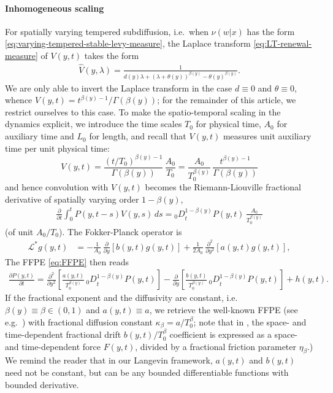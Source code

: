 \documentclass[a4paper,12pt]{elsarticle}
\numberwithin{equation}{section}
\theoremstyle{plain}
\theoremstyle{definition}
\theoremstyle{remark}
\numberwithin{equation}{section}
\newcommand{\1}{\mathbf 1}
\begin{document}
\paragraph{Inhomogeneous scaling}
For spatially varying tempered subdiffusion, i.e.\ when $\nu(w|x)$ has the form 
\eqref{eq:varying-tempered-stable-levy-measure}, 
the Laplace transform \eqref{eq:LT-renewal-measure} of $V(y,t)$ takes the form
\begin{align}
\hat V(y,\lambda) =
\frac{1}{d(y) \lambda + (\lambda + \theta(y))^{\beta(y)} - \theta(y)^{\beta(y)}}.
\end{align}
We are only able to invert the Laplace transform in the case $d \equiv 0$ and
$\theta \equiv 0$, whence $V(y,t) = t^{\beta(y)-1} / \Gamma(\beta(y))$; 
for the remainder of this article, we restrict ourselves to this case.
To make the spatio-temporal scaling in the dynamics explicit, we introduce the time scales
$T_0$ for physical time, $A_0$ for auxiliary time and $L_0$ for length, 
and recall that $V(y,t)$ measures unit auxiliary time per unit physical 
time:
$$V(y,t) = \frac{(t/T_0)^{\beta(y)-1}}{\Gamma(\beta(y))}\, \frac{A_0}{T_0}
= \frac{A_0}{T_0^{\beta(y)}} \, \frac{t^{\beta(y) - 1}}{\Gamma(\beta(y))}$$
and hence convolution with $V(y,t)$ becomes the Riemann-Liouville
fractional derivative of spatially varying order $1-\beta(y)$, 
\begin{align}
  \frac{\partial}{\partial t} \int_0^t P(y,t-s) V(y,s)\,ds
  = {_0D}_t^{1-\beta(y)} P(y,t) \, \frac{A_0}{T_0^{\beta(y)}}
\end{align}
(of unit $A_0 / T_0$).
The Fokker-Planck operator is
\begin{align}
\mathcal L^* g(y,t)
&= -\frac{1}{A_0}\,\frac{\partial }{\partial y}[b(y,t) g(y,t)]
+\frac{1}{2A_0}\,\frac{\partial^2 }{\partial y^2}[a(y,t) g(y,t)],
\end{align}
The FFPE \eqref{eq:FFPE} then reads
\begin{align} \label{eq:FFPE-with-scale}
\frac{\partial P(y,t)}{\partial t}
= \frac{\partial^2}{\partial y^2} \left[\frac{a(y,t)}{T_0^{\beta(y)}}
  \, {_0 D}_t^{1-\beta(y)} P(y,t)\right]
  - \frac{\partial}{\partial y} \left[\frac{b(y,t)}{T_0^{\beta(y)}}
  \, {_0 D}_t^{1-\beta(y)} P(y,t)\right]
  + h(y,t).
\end{align}
If the fractional exponent and the diffusivity are constant, i.e.\ 
$\beta(y) \equiv \beta \in (0,1)$ and $a(y,t) \equiv a$,
we retrieve the well-known FFPE (see e.g.\ \cite[Eq.(3)]{HLS10PRL})
with fractional diffusion constant $\kappa_\beta = a / T_0^{\beta}$;
note that in \cite{HLS10PRL}, the space- and time-dependent fractional 
drift $b(y,t) / T_0^\beta$ coefficient is expressed as a space- and 
time-dependent force $F(y,t)$, divided by a fractional friction parameter 
$\eta_\beta$.)
We remind the reader that in our Langevin framework, $a(y,t)$ and 
$b(y,t)$ need not be constant, but can be any bounded differentiable 
functions with bounded derivative. 
\end{document}
